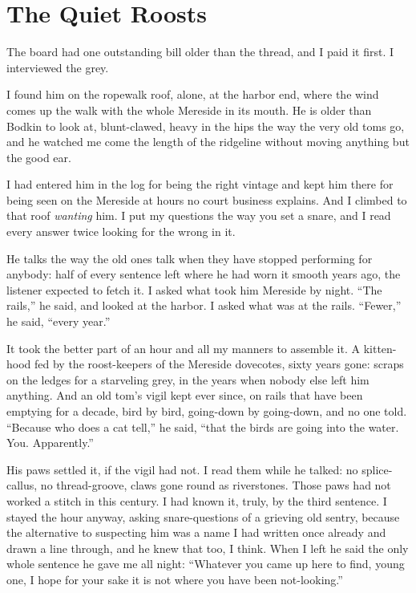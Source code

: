 \chapter{The Quiet Roosts}

The board had one outstanding bill older than the thread, and I paid it first. I interviewed the grey.

I found him on the ropewalk roof, alone, at the harbor end, where the wind comes up the walk with the whole Mereside in its mouth. He is older than Bodkin to look at, blunt-clawed, heavy in the hips the way the very old toms go, and he watched me come the length of the ridgeline without moving anything but the good ear.

I had entered him in the log for being the right vintage and kept him there for being seen on the Mereside at hours no court business explains. And I climbed to that roof \emph{wanting} him. I put my questions the way you set a snare, and I read every answer twice looking for the wrong in it.

He talks the way the old ones talk when they have stopped performing for anybody: half of every sentence left where he had worn it smooth years ago, the listener expected to fetch it. I asked what took him Mereside by night. ``The rails,'' he said, and looked at the harbor. I asked what was at the rails. ``Fewer,'' he said, ``every year.''

It took the better part of an hour and all my manners to assemble it. A kitten-hood fed by the roost-keepers of the Mereside dovecotes, sixty years gone: scraps on the ledges for a starveling grey, in the years when nobody else left him anything. And an old tom's vigil kept ever since, on rails that have been emptying for a decade, bird by bird, going-down by going-down, and no one told. ``Because who does a cat tell,'' he said, ``that the birds are going into the water. You. Apparently.''

His paws settled it, if the vigil had not. I read them while he talked: no splice-callus, no thread-groove, claws gone round as riverstones. Those paws had not worked a stitch in this century. I had known it, truly, by the third sentence. I stayed the hour anyway, asking snare-questions of a grieving old sentry, because the alternative to suspecting him was a name I had written once already and drawn a line through, and he knew that too, I think. When I left he said the only whole sentence he gave me all night: ``Whatever you came up here to find, young one, I hope for your sake it is not where you have been not-looking.''

